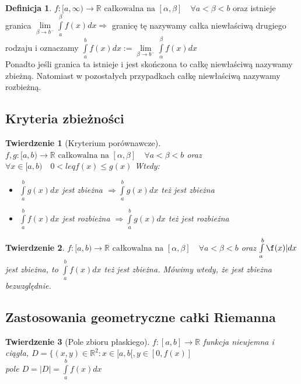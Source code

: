 \documentclass[12pt,a4paper]{article}
\newtheorem{tw}{Twierdzenie}
\theoremstyle{definition}
\newtheorem{df}{Definicja}
\begin{document}
\begin{df}
$f: [a, \infty) \to \mathbb{R} \mbox{ całkowalna na } [\alpha, \beta] \quad \forall a < \beta < b$ oraz istnieje granica $\lim\limits_{\beta\to b^-} \int\limits_a^\beta f(x)dx \Rightarrow$ granicę tę nazywamy całka niewłaściwą drugiego rodzaju i oznaczamy $\int\limits_a^b f(x)dx := \lim\limits_{\beta\to b^-} \int\limits_\alpha^\beta f(x)dx$\\
Ponadto jeśli granica ta istnieje i jest skończona to całkę niewłaściwą nazywamy zbieżną. Natomiast w pozostałych przypadkach całkę niewłaściwą nazywamy rozbieżną.
\end{df}

\subsection{Kryteria zbieżności}

\begin{tw}[Kryterium porównawcze]
$f,g: [a,b) \to \mathbb{R} \mbox{ całkowalna na } [\alpha, \beta] \quad \forall a < \beta < b$ oraz
$\forall x\in [a,b) \quad 0<leq f(x) \leq g(x)$ Wtedy:
\begin{itemize}
\item $\int\limits_a^bg(x)dx$ jest zbieżna $\Rightarrow \int\limits_a^bg(x)dx$ też jest zbieżna
\item $\int\limits_a^bf(x)dx$ jest rozbieżna $\Rightarrow \int\limits_a^bg(x)dx$ też jest rozbieżna
\end{itemize}
\end{tw}

\begin{tw}
$f: [a,b) \to \mathbb{R} \mbox{ całkowalna na } [\alpha, \beta] \quad \forall a < \beta < b$ oraz
$\int\limits_a^b \f(x)|dx$ jest zbieżna, to $\int\limits_a^b f(x)dx$ też jest zbieżna. Mówimy wtedy, że jest zbieżna bezwzględnie.
\end{tw} 

\subsection{Zastosowania geometryczne całki Riemanna}

\begin{tw}[Pole zbioru płaskiego]
$f: [a,b] \to \mathbb{R}$ funkcja nieujemna i ciągła, $D = \{(x,y) \in \mathbb{R}^2: x\in [a,b[, y\in [0, f(x)]$\\
pole $D = |D| = \int\limits_a^b f(x)dx$
\end{tw}
\end{document}
